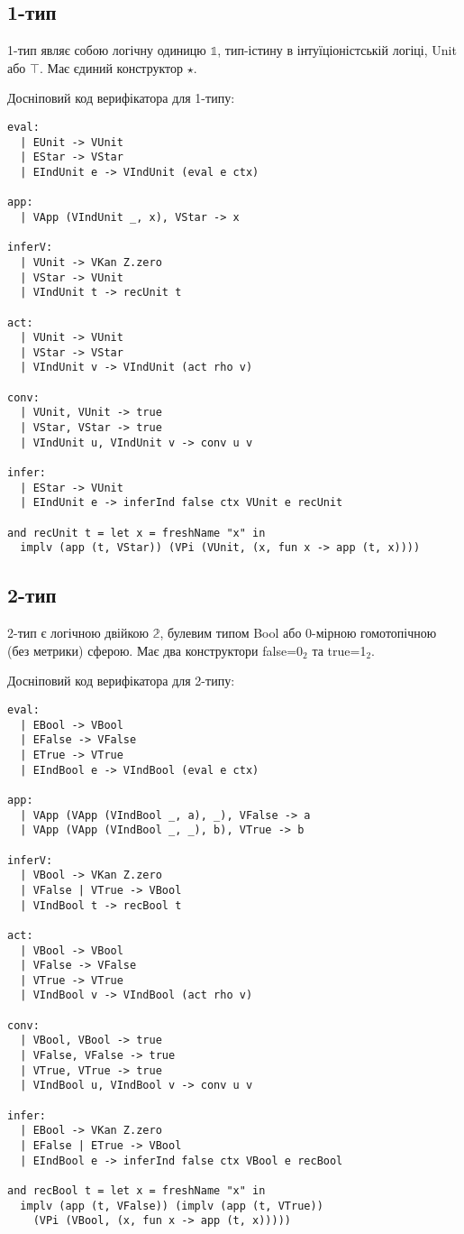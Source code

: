 \newpage
\subsection*{1-тип}
1-тип являє собою логічну одиницю $\mathbb{1}$, тип-істину
в інтуїціоністській логіці, Unit або $\top$. Має єдиний конструктор $\star$.

Досніповий код верифікатора для 1-типу:
\begin{lstlisting}
eval:
  | EUnit -> VUnit
  | EStar -> VStar
  | EIndUnit e -> VIndUnit (eval e ctx)

app:
  | VApp (VIndUnit _, x), VStar -> x

inferV:
  | VUnit -> VKan Z.zero
  | VStar -> VUnit
  | VIndUnit t -> recUnit t

act:
  | VUnit -> VUnit
  | VStar -> VStar
  | VIndUnit v -> VIndUnit (act rho v)

conv:
  | VUnit, VUnit -> true
  | VStar, VStar -> true
  | VIndUnit u, VIndUnit v -> conv u v

infer:
  | EStar -> VUnit
  | EIndUnit e -> inferInd false ctx VUnit e recUnit

and recUnit t = let x = freshName "x" in
  implv (app (t, VStar)) (VPi (VUnit, (x, fun x -> app (t, x))))
\end{lstlisting}

\newpage
\subsection*{2-тип}
2-тип є логічною двійкою $\mathbb{2}$, булевим типом Bool
або 0-мірною гомотопічною (без метрики) сферою. Має два
конструктори false=0$_2$ та true=1$_2$.

Досніповий код верифікатора для 2-типу:
\begin{lstlisting}
eval:
  | EBool -> VBool
  | EFalse -> VFalse
  | ETrue -> VTrue
  | EIndBool e -> VIndBool (eval e ctx)

app:
  | VApp (VApp (VIndBool _, a), _), VFalse -> a
  | VApp (VApp (VIndBool _, _), b), VTrue -> b

inferV:
  | VBool -> VKan Z.zero
  | VFalse | VTrue -> VBool
  | VIndBool t -> recBool t

act:
  | VBool -> VBool
  | VFalse -> VFalse
  | VTrue -> VTrue
  | VIndBool v -> VIndBool (act rho v)

conv:
  | VBool, VBool -> true
  | VFalse, VFalse -> true
  | VTrue, VTrue -> true
  | VIndBool u, VIndBool v -> conv u v

infer:
  | EBool -> VKan Z.zero
  | EFalse | ETrue -> VBool
  | EIndBool e -> inferInd false ctx VBool e recBool

and recBool t = let x = freshName "x" in
  implv (app (t, VFalse)) (implv (app (t, VTrue))
    (VPi (VBool, (x, fun x -> app (t, x)))))
\end{lstlisting}

